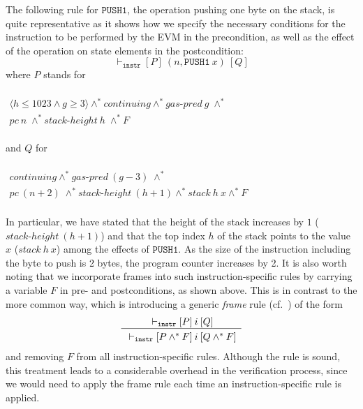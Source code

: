 \documentclass[sigplan,10pt]{acmart}\settopmatter{printfolios=true,printccs=false,printacmref=false}
\newcommand{\sconj}{\wedge^*}
\newcommand{\ttrip}[5]{\mathit{#1} \vdash_{\mathrm{#2}}[#3]\:#4\:[#5]}
\newcommand{\cont}{\mathit{continuing}}
\newcommand{\pc}{\mathit{pc}}
\newcommand{\gaspred}{\mathit{gas\mbox{-}pred}}
\newcommand{\stackh}{\mathit{stack\mbox{-}height}}
\newcommand{\stack}{\mathit{stack}}
\newcommand{\instr}[1]{\mathtt{#1}}
\newcommand{\pure}[1]{\langle#1\rangle}
\newcommand{\RuleC}[2]{\begin{array}{c}#1\\\hline\noalign{\smallskip}#2\end{array}}
\begin{document}
%
%
%
The following rule for $\instr{PUSH1}$, the operation pushing one byte on the stack, is quite representative
as it shows how we specify the necessary conditions for 
the instruction to be performed by the EVM in the precondition, as well as
the effect of the operation on state elements in the postcondition:
\[
\ttrip{}{\mathtt{instr}}{P}{(n, \instr{PUSH1}\:x)}{Q}
\]
where $P$ stands for 
\\
\\$
\begin{array}{l}
\pure{h \le 1023 \wedge g \geq 3} \sconj \cont \sconj \gaspred\:g \; \sconj \\
\pc\:n \; \sconj \stackh\:h \; \sconj F 
\end{array}
$\\ 
\\
and $Q$ for\\
\\$
\begin{array}{l}
\cont \sconj \gaspred\:(g - 3) \; \sconj \\
\pc\:(n+2) \; \sconj \stackh\:(h + 1) \sconj \stack\:h\:x \sconj F
\end{array}
$\\
\\
In particular, we have stated that the height of the stack increases by $1$ 
($\stackh\:(h + 1)$)
and that the top index $h$ of the stack points to the value $x$ ($\stack\:h\:x$)
among the effects of $\instr{PUSH1}$.
As the size of the instruction including the byte to push is 2 bytes, the program counter increases by 2.
It is also worth noting that we incorporate frames
into such instruction-specific rules by carrying a variable $F$ in pre- and
postconditions, as shown above. This is in contrast to the more common way, which is
introducing a generic \emph{frame} rule (cf.~\cite{Reynolds_02}) of the form
\[
\RuleC{\ttrip{}{\mathtt{instr}}{P}{i}{Q}}{\ttrip{}{\mathtt{instr}}{P \sconj F}{i}{Q \sconj F}}
\] 
and removing $F$ from all instruction-specific rules. Although the rule is sound, this treatment leads to 
a considerable overhead in the verification process, since we would need to apply
the frame rule each time an instruction-specific rule is applied. 
\end{document}
